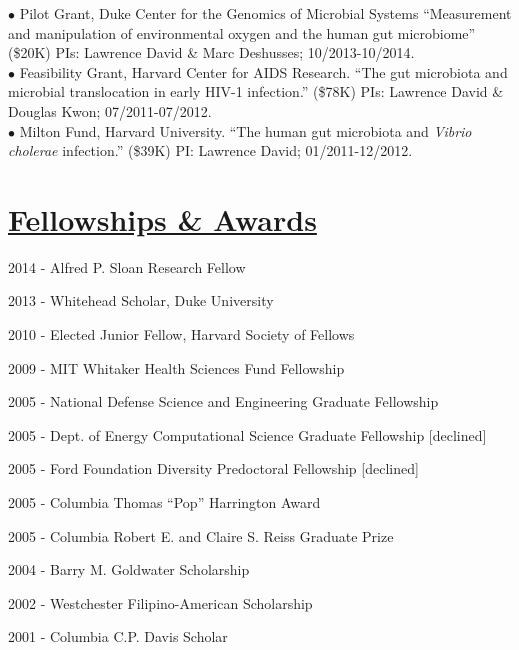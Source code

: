 \documentclass[overlapped,line,11pt]{res}
\newenvironment{list1}{
  \begin{list}{\ding{113}}{%
      \setlength{\itemsep}{0in}
      \setlength{\parsep}{0in} \setlength{\parskip}{0in}
      \setlength{\topsep}{0in} \setlength{\partopsep}{0in} 
      \setlength{\leftmargin}{0.17in}}}{\end{list}}
\begin{document}
\begin{resume}
\vspace{-10mm}
\hangindent=0.5in $\bullet$\hspace{.1in} Pilot Grant, Duke Center for
the Genomics of Microbial Systems ``Measurement and manipulation of
environmental oxygen and the human gut microbiome'' (\$20K) PIs:
Lawrence David \& Marc Deshusses; 10/2013-10/2014. \\

\vspace{-10mm}
\hangindent=0.5in $\bullet$\hspace{.1in} Feasibility Grant, Harvard
Center for AIDS Research. ``The gut microbiota and microbial
translocation in early HIV-1 infection.'' (\$78K) PIs: Lawrence David
\& Douglas Kwon; 07/2011-07/2012. \\

\vspace{-10mm}
\hangindent=0.5in $\bullet$\hspace{.1in} Milton Fund, Harvard
University. ``The human gut microbiota and \emph{Vibrio cholerae}
infection.'' (\$39K) PI: Lawrence David; 01/2011-12/2012. 

\section{\underline{\sc Fellowships \& Awards}} 
\vspace{.25in}
\begin{list1}
\item[] 2014 - Alfred P. Sloan Research Fellow %
\item[] 2013 - Whitehead Scholar, Duke University%
\item[] 2010 - Elected Junior Fellow, Harvard Society of Fellows%
\item[] 2009 - MIT Whitaker Health Sciences Fund Fellowship %
\item[] 2005 - National Defense Science and Engineering Graduate
  Fellowship %
\item[] 2005 - Dept. of Energy Computational Science Graduate Fellowship
  [declined] %
\item[] 2005 - Ford Foundation Diversity Predoctoral Fellowship
  [declined] %
\item[] 2005 - Columbia Thomas ``Pop'' Harrington Award
\item[] 2005 - Columbia Robert E. and Claire S. Reiss Graduate Prize
\item[] 2004 - Barry M. Goldwater Scholarship
\item[] 2002 - Westchester Filipino-American Scholarship
\item[] 2001 - Columbia C.P. Davis Scholar
\end{list1}


\end{resume}
\end{document}
